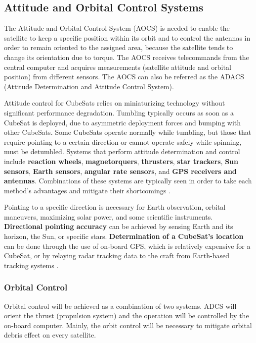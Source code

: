 \subsection{Attitude and Orbital Control Systems}
The Attitude and Orbital Control System (AOCS) is needed to enable the satellite to keep a specific position within its orbit and to control the antennas in order to remain oriented to the assigned area, because the satellite tends to change its orientation due to torque. The AOCS receives telecommands from the central computer and acquires measurements (satellite attitude and orbital position) from different sensors. The AOCS can also be referred as the ADACS (Attitude Determination and Attitude Control System).

Attitude control for CubeSats relies on miniaturizing technology without significant performance degradation. Tumbling typically occurs as soon as a CubeSat is deployed, due to asymmetric deployment forces and bumping with other CubeSats. Some CubeSats operate normally while tumbling, but those that require pointing to a certain direction or cannot operate safely while spinning, must be detumbled. Systems that perform attitude determination and control include \textbf{reaction wheels}, \textbf{magnetorquers}, \textbf{thrusters}, \textbf{star trackers}, \textbf{Sun sensors}, \textbf{Earth sensors}, \textbf{angular rate sensors}, and \textbf{GPS receivers and antennas}. Combinations of these systems are typically seen in order to take each method's advantages and mitigate their shortcomings \cite{Macdonald2014}. 

Pointing to a specific direction is necessary for Earth observation, orbital maneuvers, maximizing solar power, and some scientific instruments. \textbf{Directional pointing accuracy} can be achieved by sensing Earth and its horizon, the Sun, or specific stars. \textbf{Determination of a CubeSat's location} can be done through the use of on-board GPS, which is relatively expensive for a CubeSat, or by relaying radar tracking data to the craft from Earth-based tracking systems \cite{Macdonald2014}.

\subsubsection{Orbital Control}
Orbital control will be achieved as a combination of two systems. ADCS will orient the thrust (propulsion system) and the operation will be controlled by the on-board computer. Mainly, the orbit control will be necessary to mitigate orbital debris effect on every satellite.

